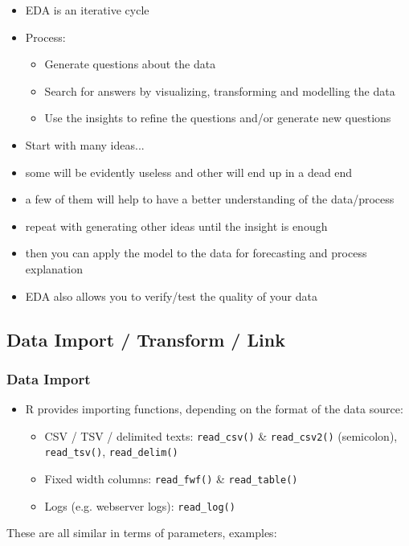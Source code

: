 \documentclass[a4paper]{article}
\begin{document}
			\begin{itemize}
				\item EDA is an iterative cycle
				\item Process:
					\begin{itemize}
						\item Generate questions about the data
						\item Search for answers by visualizing, transforming and modelling the data
						\item Use the insights to refine the questions and/or generate new questions
					\end{itemize}
				\item Start with many ideas...
				\item some will be evidently useless and other will end up in a dead end
				\item a few of them will help to have a better understanding of the data/process
				\item repeat with generating other ideas until the insight is enough
				\item then you can apply the model to the data for forecasting and process explanation
				\item EDA also allows you to verify/test the quality of your data
			\end{itemize}
		
		\subsection{Data Import / Transform / Link}
		
			\subsubsection{Data Import}
			
			\begin{itemize}
				\item R provides importing functions, depending on the format of the data source:
					\begin{itemize}
						\item CSV / TSV / delimited texts: \texttt{read\_csv()} \& \texttt{read\_csv2()} (semicolon), \texttt{read\_tsv()}, \texttt{read\_delim()}
						\item Fixed width columns: \texttt{read\_fwf()} \& \texttt{read\_table()}
						\item Logs (e.g. webserver logs): \texttt{read\_log()}
					\end{itemize}
			\end{itemize}
			These are all similar in terms of parameters, examples:
			
\end{document}
